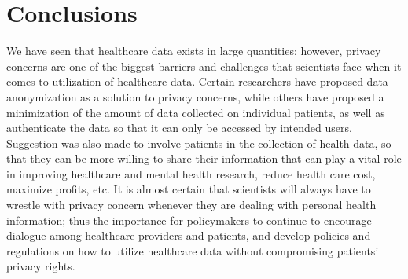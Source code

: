 \documentclass[sigconf]{acmart}
\begin{document}
\section{Conclusions}

We have seen that healthcare data exists in large quantities; however, privacy concerns are one of the biggest barriers and challenges that  scientists face when it comes to utilization of healthcare data. Certain researchers have proposed data anonymization as a solution to privacy concerns, while others have proposed a minimization of the amount of data collected on individual patients, as well as authenticate the data so that it can only be accessed by intended users. Suggestion was also made to involve patients in the collection of health data, so that they can be more willing to share their information that can play a vital role in improving healthcare and mental health research, reduce health care cost, maximize profits, etc. It is almost certain that scientists will always have to wrestle with privacy concern whenever they are dealing with personal health information; thus the importance for policymakers to continue to encourage dialogue among healthcare providers and patients, and develop policies and regulations on how to utilize healthcare data without compromising patients' privacy rights.




 
\end{document}
